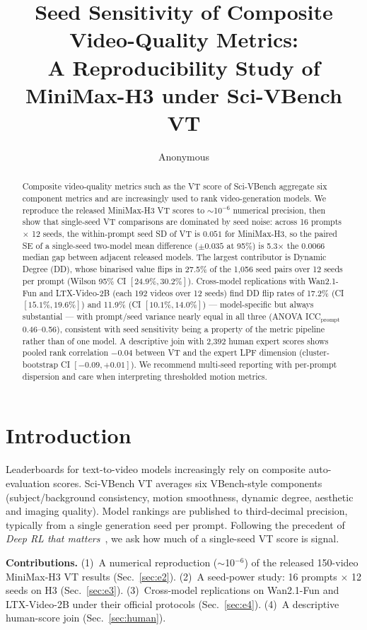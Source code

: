 \documentclass[10pt,twocolumn]{article}
\title{Seed Sensitivity of Composite Video-Quality Metrics:\\
A Reproducibility Study of MiniMax-H3 under Sci-VBench VT}
\author{Anonymous}
\date{}
\begin{document}
\maketitle

\begin{abstract}
Composite video-quality metrics such as the VT score of Sci-VBench aggregate
six component metrics and are increasingly used to rank video-generation models.
We reproduce the released MiniMax-H3 VT scores to $\sim$10$^{-6}$ numerical
precision, then show that single-seed VT comparisons are dominated by seed
noise: across 16 prompts $\times$ 12 seeds, the within-prompt seed SD of VT is
$0.051$ for MiniMax-H3, so the paired SE of a single-seed two-model mean
difference ($\pm0.035$ at 95\%) is 5.3$\times$ the $0.0066$ median gap between
adjacent released models. The largest contributor is Dynamic Degree (DD),
whose binarised value flips in 27.5\% of the 1{,}056 seed pairs over 12 seeds
per prompt (Wilson 95\% CI $[24.9\%, 30.2\%]$). Cross-model replications with Wan2.1-Fun and LTX-Video-2B (each 192 videos
over 12 seeds) find DD flip rates of 17.2\% (CI $[15.1\%, 19.6\%]$) and 11.9\%
(CI $[10.1\%, 14.0\%]$) --- model-specific but always substantial --- with
prompt/seed variance nearly equal in all three (ANOVA ICC$_{\text{prompt}}$
0.46--0.56), consistent with seed sensitivity being a property of the metric
pipeline rather than of one model. A descriptive join with 2{,}392 human expert scores shows pooled rank
correlation $-0.04$ between VT and the expert LPF dimension
(cluster-bootstrap CI $[-0.09, +0.01]$). We recommend multi-seed reporting
with per-prompt dispersion and care when interpreting thresholded motion
metrics.
\end{abstract}

\section{Introduction}
Leaderboards for text-to-video models increasingly rely on composite
auto-evaluation scores. Sci-VBench VT averages six VBench-style components
(subject/background consistency, motion smoothness, dynamic degree, aesthetic
and imaging quality). Model rankings are published to third-decimal precision,
typically from a single generation seed per prompt. Following the precedent of
\emph{Deep RL that matters}~\cite{henderson2018}, we ask how much of a
single-seed VT score is signal.

\textbf{Contributions.}
(1)~A numerical reproduction ($\sim$10$^{-6}$) of the released 150-video MiniMax-H3 VT results
(Sec.~\ref{sec:e2}).
(2)~A seed-power study: 16 prompts $\times$ 12 seeds on H3
(Sec.~\ref{sec:e3}).
(3)~Cross-model replications on Wan2.1-Fun and LTX-Video-2B under their official protocols
(Sec.~\ref{sec:e4}).
(4)~A descriptive human-score join (Sec.~\ref{sec:human}).
\end{document}
